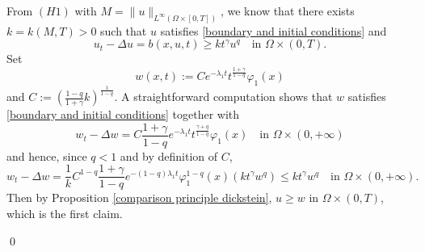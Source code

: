\documentclass[10pt,a4paper]{amsart}
\def\norm#1{\|#1\|}
\renewenvironment{proof}[1][\proofname]{\medskip \noindent {\bfseries #1. }}{\qed \bigskip}
\begin{document}
\begin{proof}
From \hyperlink{H1}{\( (H1) \)} with $M=\norm{u}_{L^{\infty}(\Omega \times [0,T])}$, we know that there exists $k=k(M, T)>0$ such that $u$ satisfies \eqref{boundary and initial conditions} and 
$$u_t-\Delta u=b(x,u,t)\geq k t^{\gamma} u^q \quad \text{in }\Omega\times (0, T).$$
Set 
$$w(x,t):= C e^{-\lambda_1 t} t^{\frac{1+\gamma}{1-q}} \varphi_1(x)$$
and $C := (\frac{1-q}{1+\gamma} k)^{\frac{1}{1-q}} 
$. 
A straightforward computation shows that $w$ satisfies \eqref{boundary and initial conditions} 
together with
$$w_t-\Delta w = C \frac{1+\gamma}{1-q} e^{-\lambda_1 t} t^{\frac{\gamma+q}{1-q}} \varphi_1(x) \quad \text{in }\Omega\times (0,+\infty)$$
and hence, since $q <1$ and by definition of $C$, 
$$w_t-\Delta w = 
\frac{1}{k} C^{1-q} \frac{1+\gamma}{1-q} e^{-(1-q) \lambda_1 t} \varphi_1^{1-q}(x) (k t^{\gamma} w^q) \leq k t^{\gamma} w^q \quad \text{in }\Omega\times (0,+\infty).$$
Then by Proposition \ref{comparison principle dickstein}, $u\geq w$ in $\Omega\times (0,T)$, which is the first claim.

\medskip


\end{proof}
\end{document}
